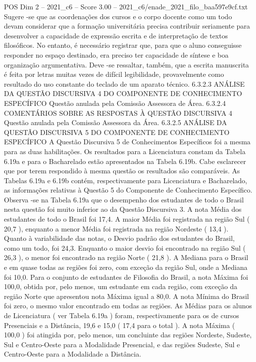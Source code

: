 \begin{textsample}{POS Dim 2 – 2021\_c6 – Score 3.00 – 2021\_c6/enade\_2021\_filo\_baa597e9cf.txt}
Sugere -se que as coordenações dos cursos e o corpo docente como um todo devam considerar que a formação universitária precisa contribuir seriamente para desenvolver a capacidade de expressão escrita e de interpretação de textos filosóficos.
No entanto, é necessário registrar que, para que o aluno conseguisse responder no espaço destinado, era preciso ter capacidade de síntese e boa organização argumentativa.
Deve -se ressaltar, também, que a escrita manuscrita é feita por letras muitas vezes de difícil legibilidade, provavelmente como resultado do uso constante do teclado de um aparato técnico. 6.3.2.3 ANÁLISE DA QUESTÃO DISCURSIVA 4 DO COMPONENTE DE CONHECIMENTO ESPECÍFICO Questão anulada pela Comissão Assessora de Área. 6.3.2.4 COMENTÁRIOS SOBRE AS RESPOSTAS À QUESTÃO DISCURSIVA 4 Questão anulada pela Comissão Assessora da Área. 6.3.2.5 ANÁLISE DA QUESTÃO DISCURSIVA 5 DO COMPONENTE DE CONHECIMENTO ESPECÍFICO A Questão Discursiva 5 de Conhecimentos Específicos foi a mesma para as duas habilitações.
Os resultados para a Licenciatura constam da Tabela 6.19a e para o Bacharelado estão apresentados na Tabela 6.19b.
Cabe esclarecer que por terem respondido à mesma questão os resultados são comparáveis.
As Tabelas 6.19a e 6.19b contém, respectivamente para Licenciatura e Bacharelado, as informações relativas à Questão 5 do Componente de Conhecimento Específico.
Observa -se na Tabela 6.19a que o desempenho dos estudantes de todo o Brasil nesta questão foi muito inferior ao da Questão Discursiva 3.
A nota Média dos estudantes de todo o Brasil foi 17,4.
A maior Média foi registrada na região Sul ( 20,7 ), enquanto a menor Média foi registrada na região Nordeste ( 13,4 ).
Quanto à variabilidade das notas, o Desvio padrão dos estudantes do Brasil, como um todo, foi 24,3.
Enquanto o maior desvio foi encontrado na região Sul ( 26,3 ), o menor foi encontrado na região Norte ( 21,8 ).
A Mediana para o Brasil e em quase todas as regiões foi zero, com exceção da região Sul, onde a Mediana foi 10,0.
Para o conjunto de estudantes de Filosofia do Brasil, a nota Máxima foi 100,0, obtida por, pelo menos, um estudante em cada região, com exceção da região Norte que apresentou nota Máxima igual a 80,0.
A nota Mínima do Brasil foi zero, o mesmo valor encontrado em todas as regiões.
As Médias para os alunos de Licenciatura ( ver Tabela 6.19a ) foram, respectivamente para os de cursos Presenciais e a Distância, 19,6 e 15,0 ( 17,4 para o total ).
A nota Máxima ( 100,0 ) foi atingida por, pelo menos, um concluinte das regiões Nordeste, Sudeste, Sul e Centro-Oeste para a Modalidade Presencial, e das regiões Sudeste, Sul e Centro-Oeste para a Modalidade a Distância.

\end{textsample}
